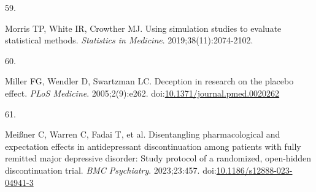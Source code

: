 \documentclass[
  11pt,
]{article}
\newlength{\cslhangindent}
\newlength{\csllabelwidth}
\newenvironment{CSLReferences}[2] %
 {\begin{list}{}{%
  \setlength{\itemindent}{0pt}
  \setlength{\leftmargin}{0pt}
  \setlength{\parsep}{0pt}
  \ifodd #1
   \setlength{\leftmargin}{\cslhangindent}
   \setlength{\itemindent}{-1\cslhangindent}
  \fi
  \setlength{\itemsep}{#2\baselineskip}}}
 {\end{list}}
\newcommand{\CSLLeftMargin}[1]{\parbox[t]{\csllabelwidth}{\strut#1\strut}}
\newcommand{\CSLRightInline}[1]{\parbox[t]{\linewidth - \csllabelwidth}{\strut#1\strut}}
\begin{document}
\begin{CSLReferences}{0}{1}
\CSLLeftMargin{59. }%
\CSLRightInline{Morris TP, White IR, Crowther MJ. Using simulation studies to evaluate statistical methods. \emph{Statistics in Medicine}. 2019;38(11):2074-2102.}

\CSLLeftMargin{60. }%
\CSLRightInline{Miller FG, Wendler D, Swartzman LC. Deception in research on the placebo effect. \emph{PLoS Medicine}. 2005;2(9):e262. doi:\href{https://doi.org/10.1371/journal.pmed.0020262}{10.1371/journal.pmed.0020262}}

\CSLLeftMargin{61. }%
\CSLRightInline{Meißner C, Warren C, Fadai T, et al. Disentangling pharmacological and expectation effects in antidepressant discontinuation among patients with fully remitted major depressive disorder: Study protocol of a randomized, open-hidden discontinuation trial. \emph{BMC Psychiatry}. 2023;23:457. doi:\href{https://doi.org/10.1186/s12888-023-04941-3}{10.1186/s12888-023-04941-3}}

\end{CSLReferences}
\end{document}
